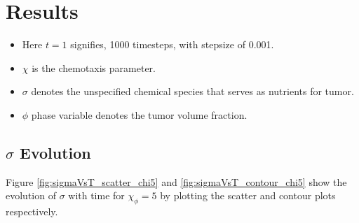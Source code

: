 \documentclass[12pt]{article}
\begin{document}
\section*{Results}
\begin{itemize}
    \item Here $t=1$ signifies, 1000 timesteps, with stepsize of 0.001.
    \item $\chi$ is the chemotaxis parameter.
    \item $\sigma$ denotes the unspecified chemical species that serves as nutrients for tumor.
    \item $\phi$ phase variable denotes the tumor volume fraction.
\end{itemize}
\subsection*{$\sigma$ Evolution}
Figure \ref{fig:sigmaVsT_scatter_chi5} and \ref{fig:sigmaVsT_contour_chi5} show the evolution of $\sigma$ with time for $\chi_\phi=5$ by plotting the scatter and contour plots respectively. 
\end{document}
